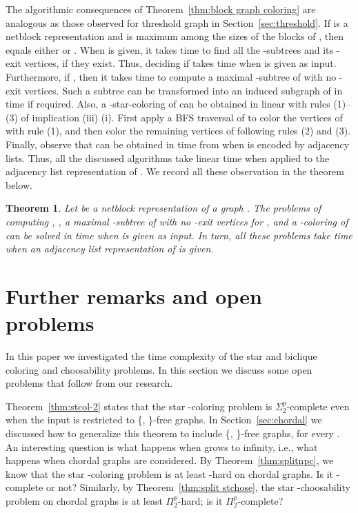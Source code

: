 \documentclass[a4paper, 11pt, oneside]{article}
\newtheorem{theorem}{Theorem}
\newcommand{\ptwop}{\ensuremath{\Pi^p_2}\xspace}
\newcommand{\stp}{\ensuremath{\Sigma^p_2}\xspace}
\begin{document}
The algorithmic consequences of Theorem~\ref{thm:block graph coloring} are analogous as those observed for threshold graph in Section~\ref{sec:threshold}.  If  is a netblock representation and  is maximum among the sizes of the blocks of , then  equals either  or .  When  is given, it takes  time to find all the -subtrees and its -exit vertices, if they exist.  Thus, deciding if  takes  time when  is given as input.  Furthermore, if , then it takes  time to compute a maximal -subtree of  with no -exit vertices.  Such a subtree can be transformed into an induced subgraph of  in  time if required.  Also, a -star-coloring  of  can be obtained in linear with rules (1)--(3) of implication (iii)  (i).  First apply a BFS traversal of  to color the vertices of  with rule (1), and then color the remaining vertices of  following rules (2) and (3).  Finally, observe that  can be obtained in  time from  when  is encoded by adjacency lists.  Thus, all the discussed algorithms take linear time when applied to the adjacency list representation of .  We record all these observation in the theorem below.

\begin{theorem}\label{thm:block graph complexity}
  Let  be a netblock representation of a graph .  The problems of computing , , a maximal -subtree of  with no -exit vertices for , and a -coloring of  can be solved in  time when  is given as input.  In turn, all these problems take  time when an adjacency list representation of  is given.
\end{theorem}



\section{Further remarks and open problems}

In this paper we investigated the time complexity of the star and biclique coloring and choosability problems.  In this section we discuss some open problems that follow from our research.

Theorem~\ref{thm:stcol-2} states that the star -coloring problem is \stp-complete even when the input is restricted to \{, \}-free graphs.  In Section~\ref{sec:chordal} we discussed how to generalize this theorem to include \{, \}-free graphs, for every .  An interesting question is what happens when  grows to infinity, i.e., what happens when chordal graphs are considered.  By Theorem~\ref{thm:splitnpc}, we know that the star -coloring problem is at least \NP-hard on chordal graphs.  Is it \NP-complete or not?  Similarly, by Theorem~\ref{thm:split stchose}, the star -choosability problem on chordal graphs is at least \ptwop-hard; is it \ptwop-complete?
\end{document}
